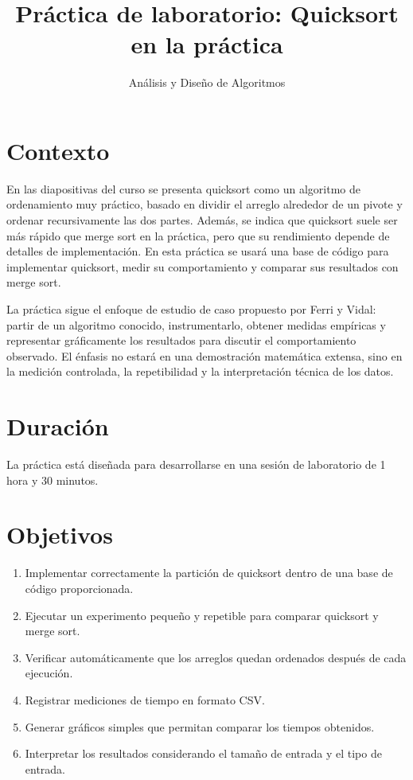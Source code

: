 \documentclass[11pt,a4paper]{article}
\title{Práctica de laboratorio: Quicksort en la práctica}
\author{Análisis y Diseño de Algoritmos}
\date{}
\begin{document}
\maketitle

\section{Contexto}

En las diapositivas del curso se presenta quicksort como un algoritmo de ordenamiento muy práctico, basado en dividir el arreglo alrededor de un pivote y ordenar recursivamente las dos partes. Además, se indica que quicksort suele ser más rápido que merge sort en la práctica, pero que su rendimiento depende de detalles de implementación. En esta práctica se usará una base de código para implementar quicksort, medir su comportamiento y comparar sus resultados con merge sort.

La práctica sigue el enfoque de estudio de caso propuesto por Ferri y Vidal: partir de un algoritmo conocido, instrumentarlo, obtener medidas empíricas y representar gráficamente los resultados para discutir el comportamiento observado. El énfasis no estará en una demostración matemática extensa, sino en la medición controlada, la repetibilidad y la interpretación técnica de los datos.

\section{Duración}

La práctica está diseñada para desarrollarse en una sesión de laboratorio de 1 hora y 30 minutos.

\section{Objetivos}

\begin{enumerate}[label=\arabic*.]
  \item Implementar correctamente la partición de quicksort dentro de una base de código proporcionada.
  \item Ejecutar un experimento pequeño y repetible para comparar quicksort y merge sort.
  \item Verificar automáticamente que los arreglos quedan ordenados después de cada ejecución.
  \item Registrar mediciones de tiempo en formato CSV.
  \item Generar gráficos simples que permitan comparar los tiempos obtenidos.
  \item Interpretar los resultados considerando el tamaño de entrada y el tipo de entrada.
\end{enumerate}
\end{document}
